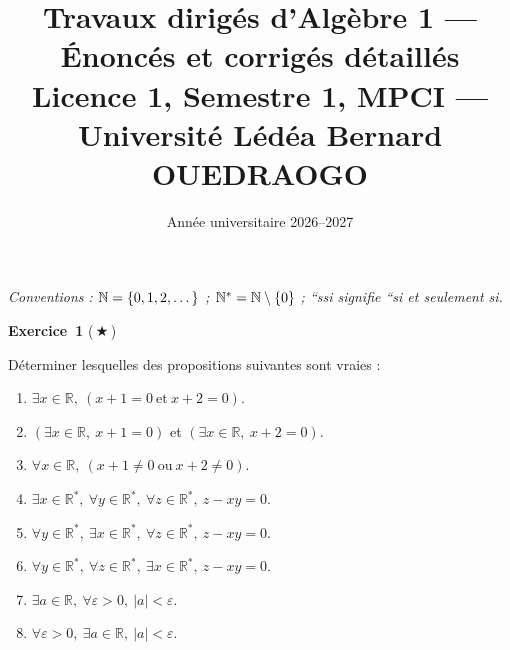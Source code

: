 \documentclass[11pt,a4paper]{article}
\title{\textbf{Travaux dirigés d'Algèbre 1 --- Énoncés et corrigés détaillés}\\[2pt]\large Licence 1, Semestre 1, MPCI --- Université Lédéa Bernard OUEDRAOGO}
\author{}\date{Année universitaire 2026--2027}
\begin{document}
	\maketitle
	\vspace{-0.8cm}
	\noindent\textit{Conventions : $\mathbb{N}=\{0,1,2,\dots\}$ ; $\mathbb{N}^*=\mathbb{N}\setminus\{0\}$ ; ``ssi signifie ``si et seulement si.}
	
	\medskip\noindent\textbf{\Large\color{bleu}Exercice~1} \textnormal{(\,$\bigstar$\,)}\nopagebreak
	\begin{enonce}
		Déterminer lesquelles des propositions suivantes sont vraies  :
		\begin{enumerate}
			\item $\exists x\in\mathbb{R},\ (x+1=0\ \text{et}\ x+2=0)$.
			\item $(\exists x\in\mathbb{R},\ x+1=0)$ et $(\exists x\in\mathbb{R},\ x+2=0)$.
			\item $\forall x\in\mathbb{R},\ (x+1\neq 0\ \text{ou}\ x+2\neq 0)$.
			\item $\exists x\in\mathbb{R}^*,\ \forall y\in\mathbb{R}^*,\ \forall z\in\mathbb{R}^*,\ z-xy=0$.
			\item $\forall y\in\mathbb{R}^*,\ \exists x\in\mathbb{R}^*,\ \forall z\in\mathbb{R}^*,\ z-xy=0$.
			\item $\forall y\in\mathbb{R}^*,\ \forall z\in\mathbb{R}^*,\ \exists x\in\mathbb{R}^*,\ z-xy=0$.
			\item $\exists a\in\mathbb{R},\ \forall\varepsilon>0,\ |a|<\varepsilon$.
			\item $\forall\varepsilon>0,\ \exists a\in\mathbb{R},\ |a|<\varepsilon$.
		\end{enumerate}
	\end{enonce}
\end{document}
